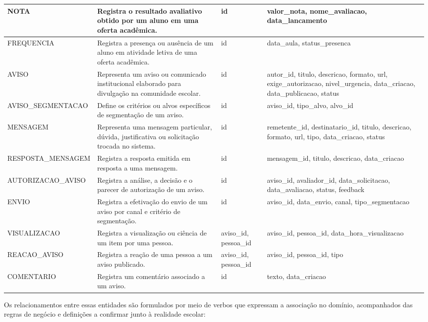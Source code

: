 \documentclass[a4paper,12pt]{report}
\begin{document}
\begin{longtable}{|p{3.0cm}|p{3.8cm}|p{2.3cm}|p{5.5cm}|}
\hline
NOTA & Registra o resultado avaliativo obtido por um aluno em uma oferta acadêmica. & id & valor\_nota, nome\_avaliacao, data\_lancamento \\
\hline
FREQUENCIA & Registra a presença ou ausência de um aluno em atividade letiva de uma oferta acadêmica. & id & data\_aula, status\_presenca \\
\hline
AVISO & Representa um aviso ou comunicado institucional elaborado para divulgação na comunidade escolar. & id & autor\_id, titulo, descricao, formato, url, exige\_autorizacao, nivel\_urgencia, data\_criacao, data\_publicacao, status \\
\hline
AVISO\_SEGMENTACAO & Define os critérios ou alvos específicos de segmentação de um aviso. & id & aviso\_id, tipo\_alvo, alvo\_id \\
\hline
MENSAGEM & Representa uma mensagem particular, dúvida, justificativa ou solicitação trocada no sistema. & id & remetente\_id, destinatario\_id, titulo, descricao, formato, url, tipo, data\_criacao, status \\
\hline
RESPOSTA\_MENSAGEM & Registra a resposta emitida em resposta a uma mensagem. & id & mensagem\_id, titulo, descricao, data\_criacao \\
\hline
AUTORIZACAO\_AVISO & Registra a análise, a decisão e o parecer de autorização de um aviso. & id & aviso\_id, avaliador\_id, data\_solicitacao, data\_avaliacao, status, feedback \\
\hline
ENVIO & Registra a efetivação do envio de um aviso por canal e critério de segmentação. & id & aviso\_id, data\_envio, canal, tipo\_segmentacao \\
\hline
VISUALIZACAO & Registra a visualização ou ciência de um item por uma pessoa. & aviso\_id, pessoa\_id & aviso\_id, pessoa\_id, data\_hora\_visualizacao \\
\hline
REACAO\_AVISO & Registra a reação de uma pessoa a um aviso publicado. & aviso\_id, pessoa\_id & aviso\_id, pessoa\_id, tipo \\
\hline
COMENTARIO & Registra um comentário associado a um aviso. & id & texto, data\_criacao \\
\hline
\end{longtable}

Os relacionamentos entre essas entidades são formulados por meio de verbos que expressam a associação no domínio, acompanhados das regras de negócio e definições a confirmar junto à realidade escolar:
\end{document}
